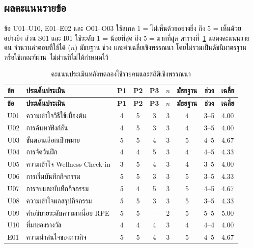 \subsection{ผลคะแนนรายข้อ}

ข้อ U01--U10, E01--E02 และ O01--O03 ใช้สเกล 1 = ไม่เห็นด้วยอย่างยิ่ง ถึง 5 = เห็นด้วยอย่างยิ่ง ส่วน S01 และ I01 ใช้ระดับ 1 = น้อยที่สุด ถึง 5 = มากที่สุด ตารางที่~\ref{tab:user-eval-item-scores} แสดงคะแนนรายคน จำนวนคำตอบที่ใช้ได้ ($n$) มัธยฐาน ช่วง และค่าเฉลี่ยเชิงพรรณนา โดยไม่รวมเป็นดัชนีมาตรฐานหรือใช้เกณฑ์ผ่าน--ไม่ผ่านที่ไม่ได้กำหนดไว้

\begingroup\footnotesize
\setlength{\tabcolsep}{3pt}\renewcommand{\arraystretch}{1.16}
\KeepTableStart
\begin{longtable}{|l|>{\raggedright\arraybackslash}p{}|c|c|c|c|c|c|c|}
\caption{คะแนนประเมินหลังทดลองใช้รายคนและสถิติเชิงพรรณนา}\label{tab:user-eval-item-scores}\\ \hline
\textbf{ข้อ} & \textbf{ประเด็นประเมิน} & \textbf{P1} & \textbf{P2} & \textbf{P3} & $n$ & \textbf{มัธยฐาน} & \textbf{ช่วง} & \textbf{เฉลี่ย} \\ \hline
\endfirsthead
\hline\textbf{ข้อ} & \textbf{ประเด็นประเมิน} & \textbf{P1} & \textbf{P2} & \textbf{P3} & $n$ & \textbf{มัธยฐาน} & \textbf{ช่วง} & \textbf{เฉลี่ย} \\ \hline
\endhead
U01 & ความเข้าใจวิธีใช้เบื้องต้น & 4 & 5 & 3 & 3 & 4 & 3--5 & 4.00 \\ \hline
U02 & การค้นหาฟังก์ชัน & 4 & 5 & 3 & 3 & 4 & 3--5 & 4.00 \\ \hline
U03 & ขั้นตอนเลือกเป้าหมาย & 5 & 5 & 4 & 3 & 5 & 4--5 & 4.67 \\ \hline
U04 & การจัดวันฝึก & 4 & 4 & 5 & 3 & 4 & 4--5 & 4.33 \\ \hline
U05 & ความเข้าใจ Wellness Check-in & 3 & 5 & 4 & 3 & 4 & 3--5 & 4.00 \\ \hline
U06 & การเริ่มบันทึกกิจกรรม & 5 & 5 & 3 & 3 & 5 & 3--5 & 4.33 \\ \hline
U07 & การจบและบันทึกกิจกรรม & 5 & 4 & 5 & 3 & 5 & 4--5 & 4.67 \\ \hline
U08 & ความเข้าใจผลสรุปกิจกรรม & 5 & 5 & 3 & 3 & 5 & 3--5 & 4.33 \\ \hline
U09 & คำอธิบายระดับความเหนื่อย RPE & 5 & 5 & -- & 2 & 5 & 5--5 & 5.00 \\ \hline
U10 & ที่มาของรางวัล & 4 & 4 & 4 & 3 & 4 & 4--4 & 4.00 \\ \hline
E01 & ความน่าสนใจของภารกิจ & 5 & 5 & 4 & 3 & 5 & 4--5 & 4.67 \\ \hline

\end{longtable}
